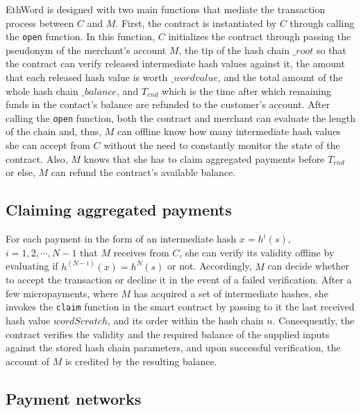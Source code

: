 
EthWord is designed with two main functions that mediate the transaction process between $C$ and $M$. First, the contract is instantiated by $C$ through calling the \texttt{open} function. In this function, $C$ initializes the contract through passing the pseudonym of the merchant's account $M$, the tip of the hash chain $\_root$ so that the contract can verify released intermediate hash values against it, the amount that each released hash value is worth $\_wordvalue$, and the total amount of the whole hash chain $\_balance$, and $T_{end}$ which is the time after which remaining funds in the contact's balance are refunded to the customer's account. After calling the \texttt{open} function, both the contract and merchant can evaluate the length of the chain and, thus, $M$ can offline know how many intermediate hash values she can accept from $C$ without the need to constantly monitor the state of the contract. Also, $M$ knows that she has to claim aggregated payments before $T_{end}$ or else, $M$ can refund the contract's available balance.

\subsection{Claiming aggregated payments} 

For each payment in the form of an intermediate hash $x=h^i(s)$, $i=1,2,\cdots,N-1$ that $M$ receives from $C$, she can verify its validity offline by evaluating if $h^{(N-i)}(x) = h^N(s)$ or not. Accordingly, $M$ can decide whether to accept the transaction or decline it in the event of a failed verification. After a few micropayments, where $M$ has acquired a set of intermediate hashes, she invokes the \texttt{claim} function in the smart contract by passing to it the last received hash value $wordScratch$, and its order within the hash chain $n$. Consequently, the contract verifies the validity and the required balance of the supplied inputs against the stored hash chain parameters, and upon successful verification, the account of $M$ is credited by the resulting balance.

\subsection{Payment networks} 

